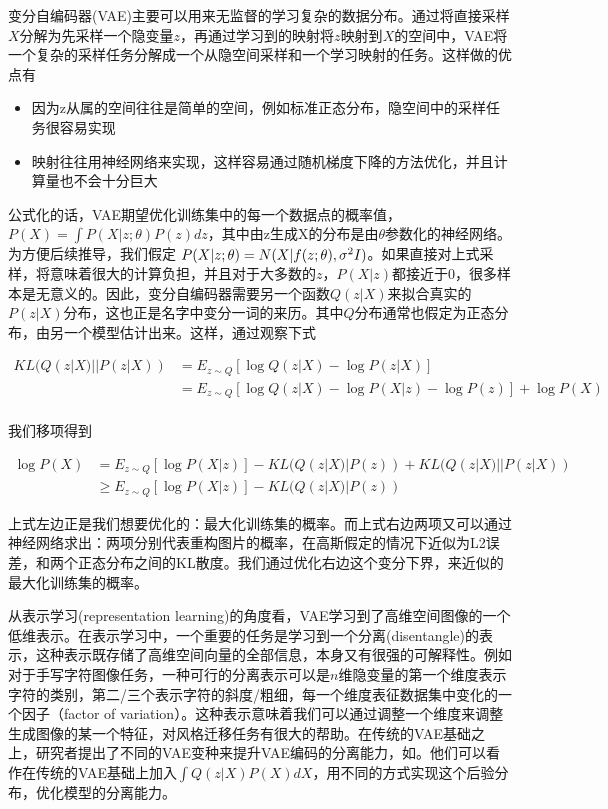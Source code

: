 \documentclass[UTF8,openany,AutoFakeBold,AutoFakeSlant,cs4size]{ctexbook}
\begin{document}
变分自编码器(VAE)主要可以用来无监督的学习复杂的数据分布。通过将直接采样$X$分解为先采样一个隐变量$z$，再通过学习到的映射将$z$映射到$X$的空间中，VAE将一个复杂的采样任务分解成一个从隐空间采样和一个学习映射的任务。这样做的优点有
\begin{itemize}
	\item 因为z从属的空间往往是简单的空间，例如标准正态分布，隐空间中的采样任务很容易实现
	\item 映射往往用神经网络来实现，这样容易通过随机梯度下降的方法优化，并且计算量也不会十分巨大
\end{itemize}

公式化的话，VAE期望优化训练集中的每一个数据点的概率值，$P(X) = \int P(X | z; \theta) P(z) dz$，其中由z生成X的分布是由$\theta$参数化的神经网络。为方便后续推导，我们假定 $P(X | z; \theta) = N(X | f(z; \theta), \sigma^2 \* I)$。如果直接对上式采样，将意味着很大的计算负担，并且对于大多数的$z$，$P(X|z)$都接近于$0$，很多样本是无意义的。因此，变分自编码器需要另一个函数$Q(z|X)$来拟合真实的$P(z|X)$分布，这也正是名字中变分一词的来历。其中$Q$分布通常也假定为正态分布，由另一个模型估计出来。这样，通过观察下式

\begin{equation}
	\begin{aligned}
		KL(Q(z|X) ||P(z|X)) &= E_{z \sim Q}[\log Q(z|X) - \log P(z | X)] \\
		&= E_{z \sim Q}[\log Q(z|X) - \log P(X | z) - \log P(z)] + \log P(X) \\
	\end{aligned}
\end{equation}

我们移项得到

\begin{equation}
	\begin{aligned}
		\log P(X) &= E_{z \sim Q}[\log P(X|z)] - KL(Q(z|X) | P(z)) + KL(Q(z|X) || P(z|X)) \\
		&\geq E_{z \sim Q}[\log P(X|z)] - KL(Q(z|X) | P(z))
	\end{aligned}
\end{equation}

上式左边正是我们想要优化的：最大化训练集的概率。而上式右边两项又可以通过神经网络求出：两项分别代表重构图片的概率，在高斯假定的情况下近似为L2误差，和两个正态分布之间的KL散度。我们通过优化右边这个变分下界，来近似的最大化训练集的概率。

从表示学习(representation learning)的角度看，VAE学习到了高维空间图像的一个低维表示。在表示学习中，一个重要的任务是学习到一个分离(disentangle)的表示，这种表示既存储了高维空间向量的全部信息，本身又有很强的可解释性。例如对于手写字符图像任务，一种可行的分离表示可以是$n$维隐变量的第一个维度表示字符的类别，第二/三个表示字符的斜度/粗细，每一个维度表征数据集中变化的一个因子（factor of variation）。这种表示意味着我们可以通过调整一个维度来调整生成图像的某一个特征，对风格迁移任务有很大的帮助。在传统的VAE基础之上，研究者提出了不同的VAE变种来提升VAE编码的分离能力，如\cite{Burgess2018UnderstandingDI, RubSchTol18b}。他们可以看作在传统的VAE基础上加入$\int Q(z|X) P(X) dX$，用不同的方式实现这个后验分布，优化模型的分离能力。
\end{document}
